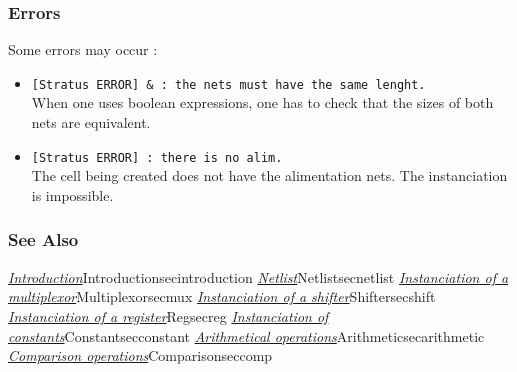 \subsubsection{Errors}
    
Some errors may occur :
\begin{itemize}
    \item \verb-[Stratus ERROR] & : the nets must have the same lenght.-\\When one uses boolean expressions, one has to check that the sizes of both nets are equivalent.
    \item \verb-[Stratus ERROR] : there is no alim.-\\The cell being created does not have the alimentation nets. The instanciation is impossible.
\end{itemize}

\subsubsection{See Also}

\hyperref[ref]{\emph{Introduction}}{}{Introduction}{secintroduction}
\hyperref[ref]{\emph{Netlist}}{}{Netlist}{secnetlist}
\hyperref[ref]{\emph{Instanciation of a multiplexor}}{}{Multiplexor}{secmux}
\hyperref[ref]{\emph{Instanciation of a shifter}}{}{Shifter}{secshift}
\hyperref[ref]{\emph{Instanciation of a register}}{}{Reg}{secreg}
\hyperref[ref]{\emph{Instanciation of constants}}{}{Constant}{secconstant}
\hyperref[ref]{\emph{Arithmetical operations}}{}{Arithmetic}{secarithmetic}
\hyperref[ref]{\emph{Comparison operations}}{}{Comparison}{seccomp}
